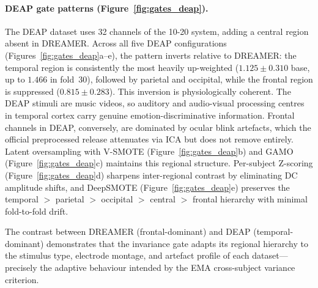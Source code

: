 \documentclass[a4paper,fleqn]{cas-sc}
\begin{document}
\paragraph{DEAP gate patterns (Figure~\ref{fig:gates_deap}).}
The DEAP dataset uses 32 channels of the 10-20 system, adding a central region absent in DREAMER. Across all five DEAP configurations (Figures~\ref{fig:gates_deap}a--e), the pattern inverts relative to DREAMER: the temporal region is consistently the most heavily up-weighted ($1.125\pm0.310$ base, up to $1.466$ in fold~30), followed by parietal and occipital, while the frontal region is suppressed ($0.815\pm0.283$). This inversion is physiologically coherent. The DEAP stimuli are music videos, so auditory and audio-visual processing centres in temporal cortex carry genuine emotion-discriminative information. Frontal channels in DEAP, conversely, are dominated by ocular blink artefacts, which the official preprocessed release attenuates via ICA but does not remove entirely. Latent oversampling with V-SMOTE (Figure~\ref{fig:gates_deap}b) and GAMO (Figure~\ref{fig:gates_deap}c) maintains this regional structure. Per-subject Z-scoring (Figure~\ref{fig:gates_deap}d) sharpens inter-regional contrast by eliminating DC amplitude shifts, and DeepSMOTE (Figure~\ref{fig:gates_deap}e) preserves the temporal $>$ parietal $>$ occipital $>$ central $>$ frontal hierarchy with minimal fold-to-fold drift.

The contrast between DREAMER (frontal-dominant) and DEAP (temporal-dominant) demonstrates that the invariance gate adapts its regional hierarchy to the stimulus type, electrode montage, and artefact profile of each dataset---precisely the adaptive behaviour intended by the EMA cross-subject variance criterion.
\end{document}
